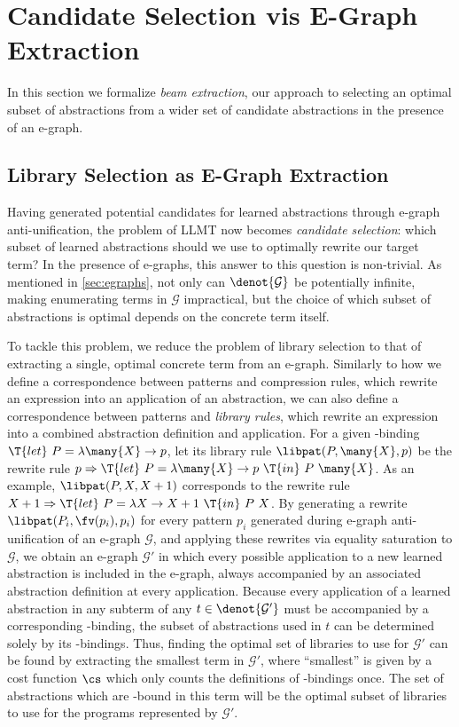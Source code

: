 \section{Candidate Selection vis E-Graph Extraction}\label{sec:beam}

In this section we formalize \emph{beam extraction}, our approach
to selecting an optimal subset of abstractions
from a wider set of candidate abstractions in the presence of an e-graph.

\subsection{Library Selection as E-Graph Extraction}

Having generated potential candidates for learned abstractions
through e-graph anti-unification, the problem of LLMT now becomes
\emph{candidate selection}: which subset of learned abstractions
should we use to optimally rewrite our target term?
%
In the presence of e-graphs, this answer to this question is
non-trivial. As mentioned in \autoref{sec:egraphs}, not only can
$\denot{\mathcal{G}}$ be potentially infinite, making enumerating terms in
$\mathcal{G}$ impractical, but the choice of which subset of abstractions
is optimal depends on the concrete term itself.

To tackle this problem, we reduce the problem of library selection to
that of extracting a single, optimal concrete term from an e-graph.
%
Similarly to how we define a correspondence between patterns and
compression rules, which rewrite an expression into an application
of an abstraction,
we can also define a correspondence between patterns and
\emph{library rules}, which rewrite an expression into a combined
abstraction definition and application.
%
For a given -binding $\T{let}\ P = \lambda \many{X} \to p$,
let its library rule $\libpat(P, \many{X}, p)$ be the rewrite rule
$p \Rightarrow \T{let}\ P = \lambda \many{X} \to p\ \T{in}\ P\ \many{X}$.
%
As an example, $\libpat(P, X, X + 1)$ corresponds to the rewrite rule
$X + 1\Rightarrow \T{let}\ P = \lambda X \to X + 1\ \T{in}\ P\ X$.
%
By generating a rewrite $\libpat(P_i, \fv(p_i), p_i)$ for every pattern
$p_i$ generated during e-graph anti-unification of an e-graph $\mathcal{G}$,
and applying these rewrites via equality saturation to $\mathcal{G}$, we
obtain an e-graph $\mathcal{G}'$ in which every possible application to a new
learned abstraction is included in the e-graph, always accompanied by an associated
abstraction definition at every application.
%
Because every application of a learned abstraction in any subterm of
any $t \in \denot{\mathcal{G}'}$ must be accompanied by a corresponding
-binding, the subset of abstractions used in $t$ can be determined
solely by its -bindings. Thus, finding the optimal set of libraries
to use for $\mathcal{G}'$ can be found by extracting the smallest term in
$\mathcal{G}'$, where ``smallest'' is given by a cost function $\cs$
which only counts the definitions of -bindings once.
%
The set of abstractions which are -bound in this term will be
the optimal subset of libraries to use for the programs represented by
$\mathcal{G}'$.

